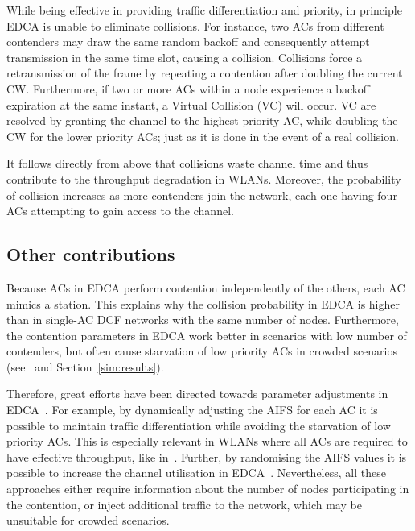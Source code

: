 While being effective in providing traffic differentiation and priority, in principle EDCA is unable to eliminate collisions. For instance, two ACs from different contenders may draw the same random backoff and consequently attempt transmission in the same time slot, causing a collision. Collisions force a retransmission of the frame by repeating a contention after doubling the current CW. Furthermore, if two or more ACs within a node experience a backoff expiration at the same instant, a Virtual Collision (VC) will occur. VC are resolved by granting the channel to the highest priority AC, while doubling the CW for the lower priority ACs; just as it is done in the event of a real collision.

It follows directly from above that collisions waste channel time and thus contribute to the throughput degradation in WLANs. Moreover, the probability of collision increases as more contenders join the network, each one having four ACs attempting to gain access to the channel.

\subsection{Other contributions}
Because ACs in EDCA perform contention independently of the others, each AC mimics a station. This explains why the collision probability in EDCA is higher than in single-AC DCF networks with the same number of nodes. Furthermore, the contention parameters in EDCA work better in scenarios with low number of contenders, but often cause starvation of low priority ACs in crowded scenarios (see~\cite{990806} and Section~\ref{sim:results}).

Therefore, great efforts have been directed towards parameter adjustments in EDCA~\cite{throughputGuarantees,6614899,4594854}. For example, by dynamically adjusting the AIFS for each AC it is possible to maintain traffic differentiation while avoiding the starvation of low priority ACs. This is especially relevant in WLANs where all ACs are required to have effective throughput, like in~\cite{6614899}. Further, by randomising the AIFS values it is possible to increase the channel utilisation in EDCA~\cite{4594854}. Nevertheless, all these approaches either require information about the number of nodes participating in the contention, or inject additional traffic to the network, which may be unsuitable for crowded scenarios.
